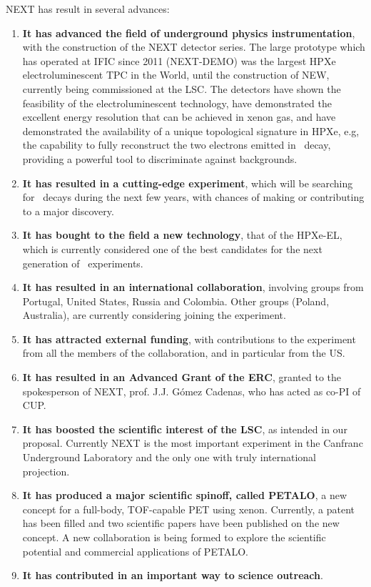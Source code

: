 NEXT has result in several advances:
\begin{enumerate}
\item {\bf It has advanced the field of underground physics instrumentation}, with the construction of the NEXT detector series. The large prototype which has operated at IFIC since 2011 (NEXT-DEMO) was the largest HPXe electroluminescent TPC in the World, until the construction of NEW, currently being commissioned at the LSC. The detectors have shown the feasibility of the electroluminescent technology, have demonstrated the excellent energy resolution that can be achieved in xenon gas, and have demonstrated  the availability of a unique topological signature in HPXe, e.g, the capability to fully reconstruct the two electrons emitted in \bb\ decay, providing a powerful tool to discriminate against backgrounds. 
\item {\bf It has resulted in a cutting-edge experiment}, which will be searching for \bbonu\ decays during the next few years, with chances of making or contributing to a major discovery. 
\item {\bf It has bought to the field a new technology}, that of the HPXe-EL, which is currently considered one of the best candidates for the next generation of \bbonu\ experiments.
 \item {\bf It has resulted in an international collaboration}, involving groups from Portugal, United States, Russia and Colombia. Other groups (Poland, Australia), are currently considering joining the experiment.
 \item {\bf It has attracted external funding}, with contributions to the experiment from all the members of the collaboration, and in particular from the US.
  \item {\bf It has resulted in an Advanced Grant of the ERC}, granted to the spokesperson of NEXT, prof. J.J. G\'omez Cadenas, who has acted as co-PI of CUP. 
   \item {\bf It has boosted the scientific interest of the LSC}, as intended in our proposal. Currently NEXT is the most important experiment in the Canfranc Underground Laboratory and the only one with truly international projection. 
  \item {\bf It has produced a major scientific spinoff, called PETALO}, a new concept for a full-body, TOF-capable PET using xenon. Currently, a patent has been filled and two scientific papers have been published on the new concept. A new collaboration is being formed to explore the scientific potential and commercial applications of PETALO. 
   \item {\bf It has contributed in an important way to science outreach}. 
\end{enumerate}
